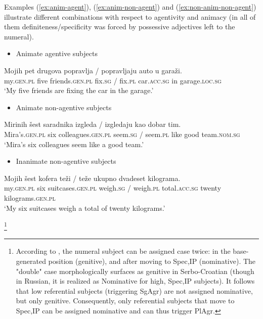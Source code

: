 \noindent Examples (\ref{ex:anim-agent}), (\ref{ex:anim-non-agent}) and (\ref{ex:non-anim-non-agent}) illustrate different combinations with respect to agentivity and animacy (in all of them definiteness/specificity was forced by possessive adjectives left to the numeral). 


\begin{itemize}
    \item Animate agentive subjects
\end{itemize}

\ea \label{ex:anim-agent}
\gll Mojih pet drugova popravlja / popravljaju auto u garaži. \\
    my.\textsc{gen.pl} five friends.\textsc{gen.pl} fix.\textsc{sg} / fix.\textsc{pl} car.\textsc{acc.sg} in garage.\textsc{loc.sg} \\
\glt ‘My five friends are fixing the car in the garage.’
\z


\begin{itemize}
    \item Animate non-agentive subjects
\end{itemize}

\ea \label{ex:anim-non-agent}
\gll Mirinih šest saradnika izgleda / izgledaju kao dobar tim. \\
    Mira's.\textsc{gen.pl} six colleagues.\textsc{gen.pl} seem.\textsc{sg} / seem.\textsc{pl} like good team.\textsc{nom.sg} \\
\glt ‘Mira’s six colleagues seem like a good team.’
\z

    

\begin{itemize} 
    \item Inanimate non-agentive subjects
\end{itemize}

\ea \label{ex:non-anim-non-agent}
\gll Mojih šest kofera teži / teže ukupno dvadeset kilograma. \\
    my.\textsc{gen.pl} six suitcases.\textsc{gen.pl} weigh.\textsc{sg} / weigh.\textsc{pl} total.\textsc{acc.sg} twenty kilograms.\textsc{gen.pl} \\
\glt ‘My six suitcases weigh a total of twenty kilograms.’

\footnote{\label{fn:double-case}According to \citet{Boskovic2008}, the numeral subject can be assigned case twice: in the base-generated position (genitive), and after moving to Spec,IP (nominative). The "double" case morphologically surfaces as genitive in Serbo-Croatian (though in Russian, it is realized as Nominative for high, Spec,IP subjects). It follows that low referential subjects (triggering SgAgr) are not assigned nominative, but only genitive. Consequently, only referential subjects that move to Spec,IP can be assigned nominative and can thus trigger PlAgr.}